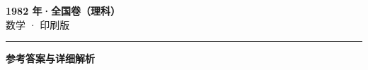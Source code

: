 \documentclass[zihao=5, a4paper]{ctexart}
\begin{document}
\begin{center}
  {\Large\bfseries 1982 年·全国卷（理科）}\\[4pt]
  {\large 数学 · 印刷版}
\end{center}
\medskip
{}

\par\bigskip\hrule\bigskip
{}
\begin{center}{\large\bfseries 参考答案与详细解析}\end{center}
\smallskip

\end{document}
